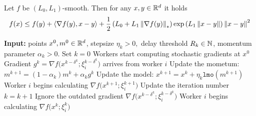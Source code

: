 \documentclass{article}
\begin{document}
\begin{lemma} 
    \label{lem:gen_smooth}
    Let $f$ be $(L_0, L_1)$-smooth. Then for any $x,y\in \mathbb{R}^d$ it holds 
    \begin{equation}
        f(x) \le f(y) + \left\langle\nabla f(y),x-y\right\rangle +\frac{1}{2}\left(L_0 + L_1\left\| \nabla f(y) \right\|_*\right)\exp\left(L_1\left\| x-y \right\|\right)\left\| x-y \right\|^2
    \end{equation}
\end{lemma}
\begin{algorithm}[H]
    \caption{\ringmaster (without calculation stops)}
    \label{alg:ringmaster_lmo}
    \begin{algorithmic}[1]
        \STATE \textbf{Input:} points $x^0, m^0 \in \mathbb{R}^d$, stepsize $\eta_k > 0,$ delay threshold $R_k \in \mathbb{N}$, momentum parameter $\alpha_k >0$.
        \STATE Set $k = 0$
        \STATE Workers start computing stochastic gradients at $x^0$
            \STATE Gradient $g^k = \nabla f\big(x^{k-\delta^k}; \xi^{k-\delta^k}_{i}\big)$ arrives from worker $i$
            \highlightcolor
                \color{black}
                \STATE Update the mometum: $m^{k+1} = (1-\alpha_k)m^{k} + \alpha_k g^k$
                \STATE Update the model:
                    $x^{k+1} = x^{k} + \eta_k\texttt{lmo}(m^{k+1})$
                \STATE Worker $i$ begins calculating 
                    $\nabla f\big(x^{k+1}; \xi^{k+1}_{i}\big)$
                \STATE Update the iteration number $k = k + 1$
            \ELSE
                \STATE Ignore the outdated gradient 
                    $\nabla f\big(x^{k-\delta^k}; \xi^{k-\delta^k}_{i}\big)$
                \STATE Worker $i$ begins calculating 
                    $\nabla f\big(x^{k}; \xi^{k}_{i}\big)$
            \ENDIF
        \ENDWHILE
    \end{algorithmic}
\end{algorithm}
\end{document}
